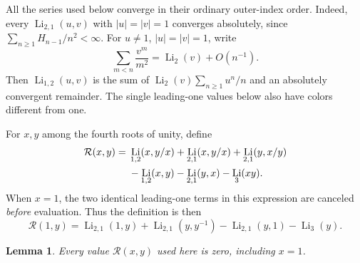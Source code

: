 \documentclass[11pt,a4paper]{article}
\numberwithin{equation}{section}
\newtheorem{lemma}[theorem]{Lemma}
\theoremstyle{definition}
\theoremstyle{remark}
\DeclareMathOperator{\Li}{Li}
\begin{document}
All the series used below converge in their ordinary outer-index order.
Indeed, every $\Li_{2,1}(u,v)$ with $|u|=|v|=1$ converges absolutely,
since $\sum_{n\ge1}H_{n-1}/n^2<\infty$.
For $u\ne1$, $|u|=|v|=1$, write
\[
 \sum_{m<n}\frac{v^m}{m^2}=\Li_2(v)+O(n^{-1}).
\]
Then $\Li_{1,2}(u,v)$ is the sum of
$\Li_2(v)\sum_{n\ge1}u^n/n$ and an absolutely convergent remainder.
The single leading-one values below also have colors different from one.

For $x,y$ among the fourth roots of unity, define
\begin{align}\label{par:eq:R}
 \mathcal R(x,y)={}&
 \Li_{1,2}(x,y/x)+\Li_{2,1}(x,y/x)
       +\Li_{2,1}(y,x/y)\notag\\
 &-\Li_{1,2}(x,y)-\Li_{2,1}(y,x)-\Li_3(xy).
\end{align}
When $x=1$, the two identical leading-one terms in this expression
are canceled \emph{before} evaluation. Thus the definition is then
\begin{equation}\label{par:eq:R-limit}
 \mathcal R(1,y)=
 \Li_{2,1}(1,y)+\Li_{2,1}(y,y^{-1})
       -\Li_{2,1}(y,1)-\Li_3(y).
\end{equation}

\begin{lemma}\label{par:lem:R}
Every value $\mathcal R(x,y)$ used here is zero, including $x=1$.
\end{lemma}
\end{document}
